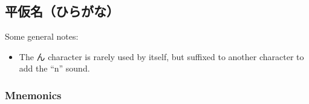 \documentclass[../nihongo-gakushuu-kyouzai-supplementary.tex]{subfiles}
\begin{document}
\appendix
\setcounter{section}{0}

\section{}

\subsection{平仮名（ひらがな）}
Some general notes:
\begin{itemize}
    \item The ん character is rarely used by itself, but suffixed to another character to add the ``n'' sound.
\end{itemize}
\subsubsection{Mnemonics}
\end{document}
